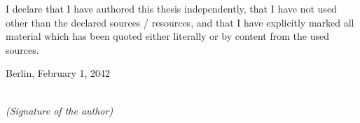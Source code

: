 \newpage
\thispagestyle{empty}

\begin{large}

\vspace*{2cm}

\noindent
I declare that I have authored this thesis independently, that I have not used other than the declared sources / resources, and that I have explicitly marked all material which has been quoted either literally or by content from the used sources.

\vspace{2cm}

\noindent
Berlin, February 1, 2042
\vspace{3cm}

\hspace*{7cm}%
\dotfill\\
\hspace*{8.5cm}%
\textit{(Signature of the author)}

\end{large}
